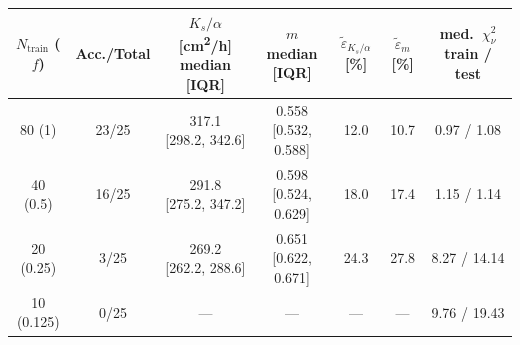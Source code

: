 {\renewcommand{\arraystretch}{1.15}\setlength{\tabcolsep}{4pt}
\begin{tabular}{c c c c c c c}
\toprule
\makecell{$N_{\mathrm{train}}$\\($f$)} & Acc./Total & \makecell{$K_s/\alpha$ [\si{cm^2/h}]\\median [IQR]} & \makecell{$m$\\median [IQR]} & \makecell{$\tilde\varepsilon_{K_s/\alpha}$\\{[\%]}} & \makecell{$\tilde\varepsilon_{m}$\\{[\%]}} & \makecell{med.\ $\chi^2_{\nu}$\\train / test} \\
\midrule
80 (\num{1}) & 23/25 & \makecell{\num{317.1}\\{[\num{298.2}, \num{342.6}]}} & \makecell{\num{0.558}\\{[\num{0.532}, \num{0.588}]}} & \num{12.0} & \num{10.7} & \num{0.97} / \num{1.08} \\
40 (\num{0.5}) & 16/25 & \makecell{\num{291.8}\\{[\num{275.2}, \num{347.2}]}} & \makecell{\num{0.598}\\{[\num{0.524}, \num{0.629}]}} & \num{18.0} & \num{17.4} & \num{1.15} / \num{1.14} \\
20 (\num{0.25}) & 3/25 & \makecell{\num{269.2}\\{[\num{262.2}, \num{288.6}]}} & \makecell{\num{0.651}\\{[\num{0.622}, \num{0.671}]}} & \num{24.3} & \num{27.8} & \num{8.27} / \num{14.14} \\
10 (\num{0.125}) & 0/25 & --- & --- & --- & --- & \num{9.76} / \num{19.43} \\
\bottomrule
\end{tabular}}

